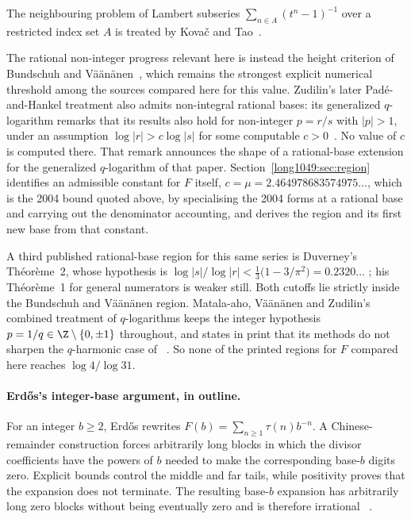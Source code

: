 The neighbouring problem of Lambert
subseries $\sum_{n\in A}(t^{n}-1)^{-1}$ over a restricted index set $A$ is
treated by Kova\v{c} and Tao~\cite{kovactao2024}.

The rational non-integer
progress relevant here is instead the height criterion of Bundschuh and
V\"a\"an\"anen~\cite{bv1994}, which remains the strongest explicit numerical
threshold among the sources compared here for this value.  Zudilin's later
Pad\'e-and-Hankel treatment also admits non-integral rational bases: its
generalized $q$-logarithm remarks that its results also hold for non-integer
$p=r/s$ with $|p|>1$, under an assumption $\log|r|>c\log|s|$ for some computable
$c>0$~\cite{zudilin2016}.  No value of $c$ is computed there.  That remark
announces the shape of a rational-base extension for the generalized
$q$-logarithm of that paper.  Section~\ref{long1049:sec:region} identifies an admissible
constant for $F$ itself, $c=\mu=2.464978683574975\ldots$, which is the 2004
bound quoted above, by specialising the 2004 forms at a rational base and
carrying out the denominator accounting, and derives the region and its first
new base from that constant.

A third published rational-base region for this same series is Duverney's
Th\'eor\`eme~2, whose hypothesis is
$\log|s|/\log|r|<\frac13\bigl(1-3/\pi^{2}\bigr)=0.2320\ldots$
\cite[Th\'eor\`eme~2, p.~174]{duverney1996}; his Th\'eor\`eme~1 for general
numerators is weaker still.  Both cutoffs lie strictly inside the Bundschuh and
V\"a\"an\"anen region.  Matala-aho, V\"a\"an\"anen and Zudilin's combined
treatment of $q$-logarithms keeps the integer hypothesis $p=1/q\in\Z\mathbin{\backslash}\{0,\pm1\}$
throughout, and states in print that its methods do not sharpen the
$q$-harmonic case of~\cite{zudilin2004}
\cite[abstract p.~879; introduction p.~880]{matalaaho2006}.  So none of the
printed regions for $F$ compared here reaches $\log4/\log31$.

\paragraph{Erd\H{o}s's integer-base argument, in outline.}
For an integer $b\ge2$, Erd\H{o}s rewrites
$F(b)=\sum_{n\ge1}\tau(n)b^{-n}$.  A Chinese-remainder construction forces
arbitrarily long blocks in which the divisor coefficients have the powers of
$b$ needed to make the corresponding base-$b$ digits zero.  Explicit bounds
control the middle and far tails, while positivity proves that the expansion
does not terminate.  The resulting base-$b$ expansion has arbitrarily long
zero blocks without being eventually zero and is therefore irrational
~\cite[pp.~63--66]{erdos1948}.

